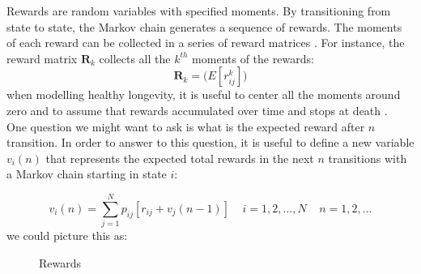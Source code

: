 \documentclass[\main/main.tex]{subfiles}
\begin{document}
Rewards are random variables with specified moments. By transitioning from state to state, the Markov chain generates a sequence of rewards. The moments of each reward can be collected in a series of reward matrices \citep{Caswell2018}. For instance, the reward matrix $\mathbf{R}_k$ collects all the $k^{th}$ moments of the rewards:
\begin{equation}
\mathbf{R}_k = \big( E[r^k_{ij}] \big)
\end{equation}
when modelling healthy longevity, it is useful to center all the moments around zero and to assume that rewards accumulated over time and stops at death \citep{Caswell2018}.\\

One question we might want to ask is what is the expected reward after $n$ transition. In order to answer to this question, it is useful to define a new variable $v_i(n)$ that represents the expected total rewards in the next $n$ transitions with a Markov chain starting in state $i$:

\begin{equation}\label{rewards}
    v_i(n) = \sum_{j=1}^N p_{ij} [ r_{ij} + v_j(n-1) ] \; \;\;\; i = 1,2,...,N \;\;\;\; n=1,2,...
\end{equation}
we could picture this as:

\begin{figure}[H]
\centering
{}
\caption{Rewards}
\label{fig:markov_chain}
\end{figure}
\end{document}
